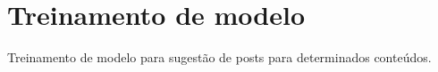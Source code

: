 \section{Treinamento de modelo}

Treinamento de modelo para sugestão de posts para determinados conteúdos.
